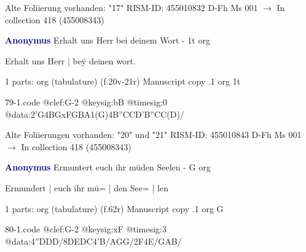 \documentclass[twocolumn]{book}
\begin{document}
\newline Alte Foliierung vorhanden: "17"
\newline RISM-ID: 455010832
\newline D-Fh  Ms 001
\newline $\rightarrow$ In collection 418 (455008343)
      
\newline \par \vspace{7pt} \textcolor{darkblue}{\textbf{Anonymus  }}
\newline Erhalt uns Herr bei deinem Wort - 1t
\newline org
\newline \begin{itshape}[f.20r, at left:] Erhalt uns Herr | beÿ deinen wort.\end{itshape} 
\newline \textcolor{darkblue}{}  1 parts: org (tabulature)  (f.20v-21r)
\newline Manuscript copy
.1  org  1t  
\begin{filecontents*}{79-1.code}
@clef:G-2
@keysig:bB
@timesig:0
@data:2'G4BGxFGBA1(G)4B''CCD'B''CC(D)/
\end{filecontents*}
\newline
%

\newline Alte Foliierungen vorhanden: "20" und "21"
\newline RISM-ID: 455010843
\newline D-Fh  Ms 001
\newline $\rightarrow$ In collection 418 (455008343)
      
\newline \par \vspace{7pt} \textcolor{darkblue}{\textbf{Anonymus  }}
\newline Ermuntert euch ihr müden Seelen - G
\newline org
\newline \begin{itshape}[f.62r, at left:] Ermundert | euch ihr mü= | den See= | len\end{itshape} 
\newline \textcolor{darkblue}{}  1 parts: org (tabulature)  (f.62r)
\newline Manuscript copy
.1  org  G  
\begin{filecontents*}{80-1.code}
@clef:G-2
@keysig:xF
@timesig:3
@data:4''DDD/{8DEDC}4'B/AGG/2F4E/GAB/
\end{filecontents*}
\newline
%
\end{document}
